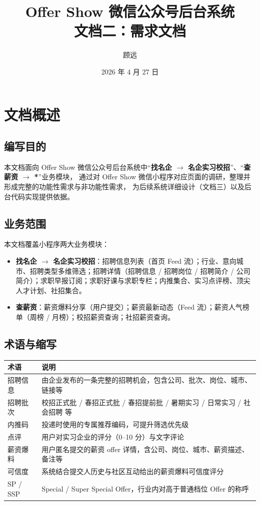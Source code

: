 \documentclass[12pt,a4paper]{ctexart}
\title{\textbf{Offer Show 微信公众号后台系统\\ 文档二：需求文档}}
\author{顾远\quad 23301095}
\date{2026 年 4 月 27 日}
\begin{document}
\maketitle
\tableofcontents
\newpage

\section{文档概述}

\subsection{编写目的}
本文档面向 Offer Show 微信公众号后台系统中“\textbf{找名企 $\rightarrow$ 名企实习校招}”、“\textbf{查薪资 $\rightarrow$ *}”业务模块，
通过对 Offer Show 微信小程序对应页面的调研，整理并形成完整的功能性需求与非功能性需求，
为后续系统详细设计（文档三）以及后台代码实现提供依据。

\subsection{业务范围}
本文档覆盖小程序两大业务模块：
\begin{itemize}[leftmargin=2em]
    \item \textbf{找名企 $\rightarrow$ 名企实习校招}：招聘信息列表（首页 Feed 流）；行业、意向城市、招聘类型多维筛选；招聘详情（招聘信息 / 招聘岗位 / 招聘简介 / 公司简介）；求职早报订阅；求职好课与求职专栏；内推集合、实习点评榜、顶尖人才计划、社招集合。
    \item \textbf{查薪资}：薪资爆料分享（用户提交）；薪资最新动态（Feed 流）；薪资人气榜单（周榜 / 月榜）；校招薪资查询；社招薪资查询。
\end{itemize}

\subsection{术语与缩写}
\begin{tabularx}{\textwidth}{lX}
\toprule
\textbf{术语} & \textbf{说明}\\
\midrule
招聘信息 & 由企业发布的一条完整的招聘机会，包含公司、批次、岗位、城市、链接等\\
招聘批次 & 校招正式批 / 春招正式批 / 春招提前批 / 暑期实习 / 日常实习 / 社会招聘 等\\
内推码 & 投递时使用的专属推荐编码，可提升筛选优先级\\
点评 & 用户对实习企业的评分（0--10 分）与文字评论\\
薪资爆料 & 用户匿名提交的薪资 offer 详情，含公司、岗位、城市、薪资描述、备注等\\
可信度 & 系统结合提交人历史与社区互动给出的薪资爆料可信度评分\\
SP / SSP & Special / Super Special Offer，行业内对高于普通档位 Offer 的称呼\\
\bottomrule
\end{tabularx}
\end{document}
